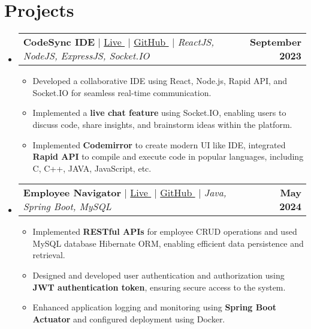 \documentclass[letterpaper,11pt]{article}
\makeatletter
\newcommand{\resumeItem}[1]{
  \item\small{
    {#1 \vspace{-2pt}}
  }
}
\newcommand{\resumeProjectHeading}[2]{
    \item
    \begin{tabular*}{1.001\textwidth}{l@{\extracolsep{\fill}}r}
      \small#1 & \textbf{\small #2}\\
    \end{tabular*}\vspace{-7pt}
}
\newcommand{\resumeSubHeadingListStart}{\begin{itemize}[leftmargin=0.0in, label={}]}
\newcommand{\resumeItemListStart}{\begin{itemize}}
\newcommand{\resumeItemListEnd}{\end{itemize}\vspace{-5pt}}
\makeatother
\begin{document}
\section{Projects}
    \vspace{-5pt}
    \resumeSubHeadingListStart
    \resumeProjectHeading 
        {\textbf{{CodeSync IDE}} $|$ \href{https://codesyncide.vercel.app}{Live $ $}{\faExternalLink} $|$ $ $\href{https://github.com/keshavop/CodeSync-IDE}{GitHub $ $}{\faExternalLink} $|$ \emph{ReactJS, NodeJS, ExpressJS, Socket.IO}}
        {September 2023}
        \resumeItemListStart
        \vspace{1pt}
          \resumeItem{Developed a collaborative IDE using React, Node.js, Rapid API,  and Socket.IO for seamless  real-time communication.}
          \vspace{1pt}
          \resumeItem{Implemented a \textbf{live chat feature} using Socket.IO, enabling users to discuss code, share insights, and brainstorm ideas within the platform. }
          \vspace{1pt}
          \resumeItem{Implemented \textbf{Codemirror} to create modern UI like IDE, integrated \textbf{Rapid API} to compile and execute code in popular languages, including C, C++, JAVA, JavaScript, etc. }
          \vspace{1pt}
        \resumeItemListEnd
        \vspace{-16pt}
    
    \resumeProjectHeading
        {\textbf{{Employee Navigator}} $|$ \href{https://github.com/keshavop/Employee-ops-management-system}{Live $ $}{\faExternalLink} $|$ $ $\href{https://github.com/keshavop/Employee-ops-management-system}{GitHub $ $}{\faExternalLink} $|$ \emph{Java, Spring Boot, MySQL}}
        {May 2024}
        \resumeItemListStart
        \vspace{1pt}
          \resumeItem{Implemented \textbf{RESTful APIs} for employee CRUD operations and used MySQL database Hibernate ORM, enabling efficient data persistence and retrieval.}
          \vspace{1pt}
          \resumeItem{Designed and developed user authentication and authorization using \textbf{JWT authentication token}, ensuring secure access to the system.}
          \vspace{1pt}
          \resumeItem{Enhanced application logging and monitoring using \textbf{Spring Boot Actuator} and configured deployment using Docker.}
          \vspace{1pt}
        \resumeItemListEnd
        \vspace{-16pt}
        \resumeItemListEnd\textit{}
\vspace{-3pt}
\end{document}
